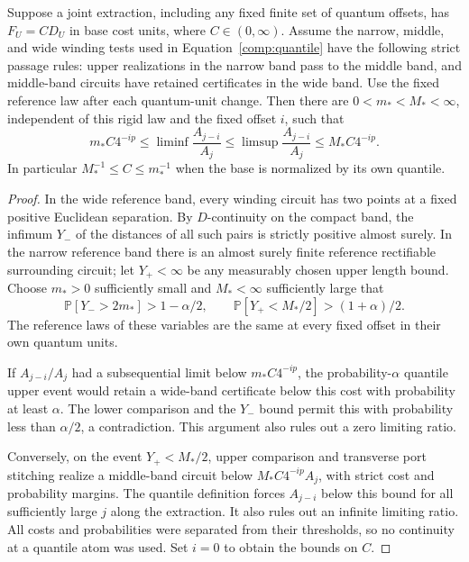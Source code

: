 \begin{lemma}\label{comp:rigid-quantiles}
Suppose a joint extraction, including any fixed finite set of quantum
offsets, has $F_U=CD_U$ in base cost units, where $C\in(0,\infty)$.
Assume the narrow, middle, and wide winding tests used in
Equation~\eqref{comp:quantile} have the following strict passage rules:
upper realizations in the narrow band pass to the middle band, and
middle-band circuits have retained certificates in the wide band.
Use the fixed reference law after each quantum-unit change.
Then there are $0<m_*<M_*<\infty$, independent of this rigid law and
the fixed offset $i$, such that
\begin{equation}\label{comp:rigid-ratio-bounds}
 m_*C4^{-ip}\le
 \liminf\frac{A_{j-i}}{A_j}
 \le\limsup\frac{A_{j-i}}{A_j}
 \le M_*C4^{-ip}.
\end{equation}
In particular $M_*^{-1}\le C\le m_*^{-1}$ when the base is normalized
by its own quantile.
\end{lemma}

\begin{proof}
In the wide reference band, every winding circuit has two points at
a fixed positive Euclidean separation.  By $D$-continuity on the
compact band, the infimum $Y_-$ of the distances of all such pairs is
strictly positive almost surely.  In the narrow reference band there
is an almost surely finite reference rectifiable surrounding circuit;
let $Y_+<\infty$ be any measurably chosen upper length bound.  Choose
$m_*>0$ sufficiently small and $M_*<\infty$ sufficiently large that
\[
 \mathbb P[Y_->2m_*]>1-\alpha/2,\qquad
 \mathbb P[Y_+<M_*/2]>(1+\alpha)/2.
\]
The reference laws of these variables are the same at every fixed
offset in their own quantum units.

If $A_{j-i}/A_j$ had a subsequential limit below
$m_*C4^{-ip}$, the probability-$\alpha$ quantile upper event would
retain a wide-band certificate below this cost with probability at
least $\alpha$.  The lower comparison and the $Y_-$ bound permit
this with probability less than $\alpha/2$, a contradiction.  This
argument also rules out a zero limiting ratio.

Conversely, on the event $Y_+<M_*/2$, upper comparison and transverse
port stitching realize a middle-band circuit below
$M_*C4^{-ip}A_j$, with strict cost and probability margins.
The quantile definition forces $A_{j-i}$ below this bound for all
sufficiently large $j$ along the extraction.  It also rules out an
infinite limiting ratio.  All costs and probabilities were separated
from their thresholds, so no continuity at a quantile atom was used.
Set $i=0$ to obtain the bounds on $C$.
\end{proof}

